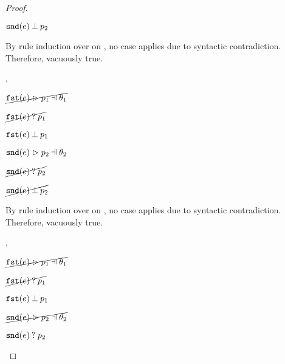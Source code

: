 \begin{proof}
\begin{byCases}
\begin{byCases}
\begin{byCases}
\begin{pfsteps*}
            \item $\mathtt{snd}(e) \mathbin{\bot} p_2$  
            \end{pfsteps*}
            By rule induction over  on , no case applies due to syntactic contradiction.\\
            Therefore, vacuously true.
        \item[\hnotmatch{\hfst{e}}{p_1},\hpatmatch{\hsnd{e}}{p_2}{\theta_2}]
            \begin{pfsteps*}
            \item $\cancel{\hpatmatch{\hfst{e}}{p_1}{\theta_1}}$  
            \item $\cancel{\mathtt{fst}(e) \mathbin{?} p_1}$  
            \item $\mathtt{fst}(e) \mathbin{\bot} p_1$  
            \item $\hpatmatch{\hsnd{e}}{p_2}{\theta_2}$  
            \item $\cancel{\mathtt{snd}(e) \mathbin{?} p_2}$  
            \item $\cancel{\mathtt{snd}(e) \mathbin{\bot} p_2}$  
            \end{pfsteps*}
            By rule induction over  on , no case applies due to syntactic contradiction.\\
            Therefore, vacuously true.
        \item[\hnotmatch{\hfst{e}}{p_1},\hmaymatch{\hsnd{e}}{p_2}]
            \begin{pfsteps*}
            \item $\cancel{\hpatmatch{\hfst{e}}{p_1}{\theta_1}}$  
            \item $\cancel{\mathtt{fst}(e) \mathbin{?} p_1}$  
            \item $\mathtt{fst}(e) \mathbin{\bot} p_1$  
            \item $\cancel{\hpatmatch{\hsnd{e}}{p_2}{\theta_2}}$  
            \item $\mathtt{snd}(e) \mathbin{?} p_2$  

\end{pfsteps*}
\end{byCases}
\end{byCases}
\end{byCases}
\end{proof}
